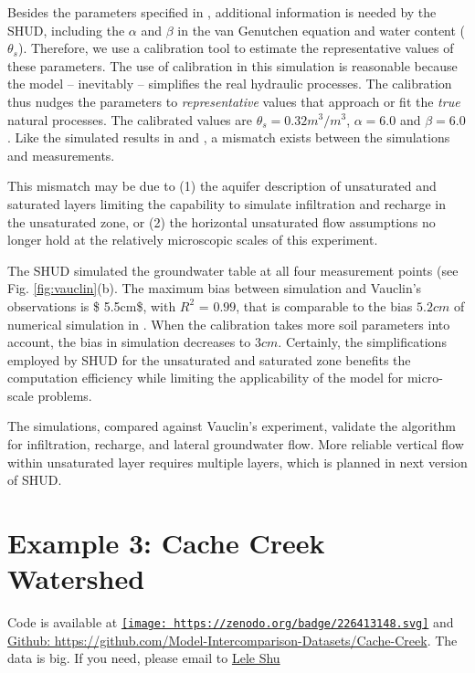 \documentclass[
]{scrbook}
\begin{document}
Besides the parameters specified in \citep{Vauclin1979}, additional information is needed by the SHUD, including the \(\alpha\) and \(\beta\) in the van Genutchen equation and water content (\(\theta _s\)). Therefore, we use a calibration tool to estimate the representative values of these parameters. The use of calibration in this simulation is reasonable because the model -- inevitably -- simplifies the real hydraulic processes. The calibration thus nudges the parameters to \emph{representative} values that approach or fit the \emph{true} natural processes. The calibrated values are \(\theta _s = 0.32 m^3/m^3\), \(\alpha = 6.0\) and \(\beta = 6.0\). Like the simulated results in \citep{Vauclin1979} and \citep{Shen2010}, a mismatch exists between the simulations and measurements.

This mismatch may be due to (1) the aquifer description of unsaturated and saturated layers limiting the capability to simulate infiltration and recharge in the unsaturated zone, or (2) the horizontal unsaturated flow assumptions no longer hold at the relatively microscopic scales of this experiment.

The SHUD simulated the groundwater table at all four measurement points (see Fig. \ref{fig:vauclin}(b). The maximum bias between simulation and Vauclin's observations is \$ 5.5cm\$, with \(R^2\) = \(0.99\), that is comparable to the bias \(5.2 cm\) of numerical simulation in \citep{Vauclin1979}. When the calibration takes more soil parameters into account, the bias in simulation decreases to \(3 cm\). Certainly, the simplifications employed by SHUD for the unsaturated and saturated zone benefits the computation efficiency while limiting the applicability of the model for micro-scale problems.

The simulations, compared against Vauclin's experiment, validate the algorithm for infiltration, recharge, and lateral groundwater flow. More reliable vertical flow within unsaturated layer requires multiple layers, which is planned in next version of SHUD.

\hypertarget{example-3-cache-creek-watershed}{%
\section{Example 3: Cache Creek Watershed}\label{example-3-cache-creek-watershed}}

Code is available at \href{https://zenodo.org/badge/latestdoi/226413148}{\texttt{[image: https://zenodo.org/badge/226413148.svg]}}
and \href{https://github.com/Model-Intercomparison-Datasets/Cache-Creek}{Github: https://github.com/Model-Intercomparison-Datasets/Cache-Creek}. The data is big. If you need, please email to \href{mailto:lele.shu@gmail.com}{Lele Shu}
\end{document}
